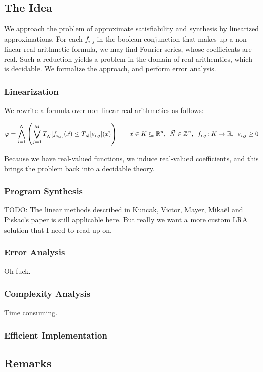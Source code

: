 \documentclass[12pt]{article}
\begin{document}
\subsection{The Idea}
We approach the problem of approximate satisfiability and synthesis
by linearized approximations.
For each $f_{i, j}$ in the boolean conjunction that makes up a
non-linear real arithmetic formula,
we may find Fourier series, whose coefficients are real.
Such a reduction yields a problem in the domain of real arithemtics, which
is decidable.
We formalize the approach, and perform error analysis.

\subsubsection{Linearization}
We rewrite a formula over non-linear real arithmetics as follows:

\begin{align*}
  \varphi
    = \bigwedge_{i = 1}^{N} {\left(\bigvee_{j = 1}^{M}
      T_{\vec{N}} {\left[f_{i,j}\right]}{\left(\vec{x}\right)}
      \leq T_{\vec{N}} {\left[\varepsilon_{i,j}\right]} {\left(\vec{x}\right)}\right)}
  \qquad
  \vec{x} \in K \subseteq {\mathbb{R}}^n, \enskip
  \vec{N} \in {\mathbb{Z}}^n, \enskip
  {f_{i, j} \colon K \to {\mathbb{R}}}, \enskip
  \varepsilon_{i, j} \geq 0
\end{align*}

Because we have real-valued functions, we induce real-valued coefficients,
and this brings the problem back into a decidable theory.


\subsubsection{Program Synthesis}
TODO: The linear methods described in Kuncak, Victor, Mayer, Mika\"{e}l
and Piskac's paper is still applicable here.
But really we want a more custom LRA solution that I need to read up on.


\subsubsection{Error Analysis}
Oh fuck.

\subsubsection{Complexity Analysis}
Time consuming.

\subsubsection{Efficient Implementation}


\subsection{Remarks}



\printbibliography
\end{document}
